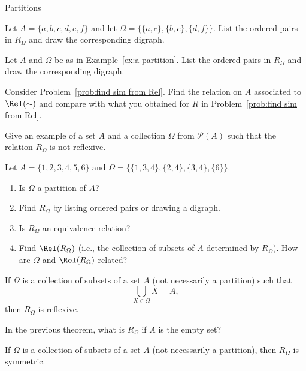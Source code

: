 \begin{section}{Partitions}
\begin{problem}
Let $A=\{a,b,c,d,e,f\}$ and let $\Omega=\{\{a,c\},\{b,c\},\{d,f\}\}$.  List the ordered pairs in $R_{\Omega}$ and draw the corresponding digraph.
\end{problem}

\begin{problem}
Let $A$ and $\Omega$ be as in Example~\ref{ex:a partition}. List the ordered pairs in $R_{\Omega}$ and draw the corresponding digraph.
\end{problem}

\begin{problem}
Consider Problem~\ref{prob:find sim from Rel}. Find the relation on $A$ associated to $\Rel(\sim)$ and compare with what you obtained for $R$ in Problem~\ref{prob:find sim from Rel}.
\end{problem}

\begin{problem}
Give an example of a set $A$ and a collection $\Omega$ from $\mathcal{P}(A)$ such that the relation $R_{\Omega}$ is not reflexive.
\end{problem}

\begin{problem}
Let $A=\{1,2,3,4,5,6\}$ and $\Omega=\{\{1,3,4\},\{2,4\},\{3,4\},\{6\}\}$. 
\begin{enumerate}[label=\textrm{(\alph*)}]
\item Is $\Omega$ a partition of $A$?
\item Find $R_{\Omega}$ by listing ordered pairs or drawing a digraph.
\item Is $R_{\Omega}$ an equivalence relation?
\item Find $\Rel(R_\Omega)$ (i.e., the collection of subsets of $A$ determined by $R_{\Omega}$). How are $\Omega$ and $\Rel(R_\Omega)$ related?
\end{enumerate}
\end{problem}

\begin{theorem}\label{thm:union yields reflexive}
If $\Omega$ is a collection of subsets of a set $A$ (not necessarily a partition) such that
\[
\bigcup_{X\in\Omega}X=A,
\]
then $R_{\Omega}$ is reflexive.
\end{theorem}

\begin{problem}
In the previous theorem, what is $R_{\Omega}$ if $A$ is the empty set?
\end{problem}

\begin{theorem}\label{thm:always symmetric}
If $\Omega$ is a collection of subsets of a set $A$ (not necessarily a partition), then $R_{\Omega}$ is symmetric.
\end{theorem}


\end{section}
